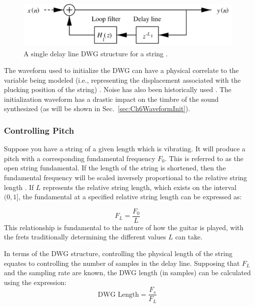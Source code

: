\documentclass[main.tex]{subfiles}
\begin{document}
\begin{figure}[h]
    \centering
    \includegraphics[scale=1]{./images/diagrams/SDLModel.png}
    \caption{A single delay line DWG structure for a string .}
    \label{fig:SDLModel}
\end{figure}

The waveform used to initialize the DWG can have a physical correlate to
the variable being modeled (i.e., representing the displacement associated with the plucking position of the string) . Noise has also been historically used . The initialization waveform has a drastic impact on the timbre of the sound synthesized (as will be shown in Sec.~\ref{sec:Ch6WaveformInit}).

\subsubsection{Controlling Pitch}
Suppose you have a string of a given length which is vibrating. It will produce a pitch with a corresponding fundamental frequency $F_0$. This is referred to as the open string fundamental. If the length of the string is shortened, then the fundamental frequency will be scaled inversely proportional to the relative string length . If $L$ represents the relative string length, which exists on the interval $(0, 1]$, the fundamental at a specified relative string length can be expressed as:

\begin{equation}
    F_L = \frac{F_0}{L}
    \label{eq:F_L}
\end{equation}
This relationship is fundamental to the nature of how the guitar is played, with the frets traditionally determining the different values $L$ can take.

In terms of the DWG structure, controlling the physical length of the string equates to controlling the number of samples in the delay line. Supposing that $F_L$ and the sampling rate are known, the DWG length (in samples) can be calculated using the expression:
\begin{equation}
    \text{DWG Length} = \frac{F_s}{F_L}
\end{equation}
\end{document}
